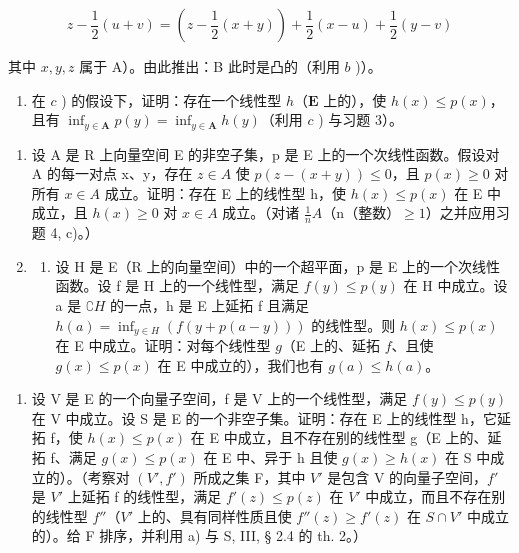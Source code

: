\[
z - \frac {1}{2} (u + v) = \left(z - \frac {1}{2} (x + y)\right) + \frac {1}{2} (x - u) + \frac {1}{2} (y - v)
\]

其中 \(x, y, z\) 属于 A）。由此推出：B 此时是凸的（利用 \(b\) )）。

\begin{enumerate}
\def\labelenumi{\alph{enumi})}
\setcounter{enumi}{3}
\tightlist
\item
  在 \(c\) ) 的假设下，证明：存在一个线性型 \(h\)（\(\mathbf{E}\) 上的），使 \(h(x) \leqslant p(x)\)，且有 \(\inf_{y \in \mathbf{A}} p(y) = \inf_{y \in \mathbf{A}} h(y)\)（利用 \(c\) ) 与习题 3）。
\end{enumerate}

\begin{enumerate}
\def\labelenumi{\arabic{enumi})}
\setcounter{enumi}{4}
\item
  设 A 是 R 上向量空间 E 的非空子集，p 是 E 上的一个次线性函数。假设对 A 的每一对点 x、y，存在 \(z \in A\) 使 \(p(z - (x + y)) \leqslant 0\)，且 \(p(x) \geqslant 0\) 对所有 \(x \in A\) 成立。证明：存在 E 上的线性型 h，使 \(h(x) \leqslant p(x)\) 在 E 中成立，且 \(h(x) \geqslant 0\) 对 \(x \in A\) 成立。（对诸 \(\frac{1}{n}A\)（n（整数）\(\geqslant 1\)）之并应用习题 4, c)。）
\item
  \begin{enumerate}
  \def\labelenumii{\alph{enumii})}
  \tightlist
  \item
    设 H 是 E（R 上的向量空间）中的一个超平面，p 是 E 上的一个次线性函数。设 f 是 H 上的一个线性型，满足 \(f(y) \leqslant p(y)\) 在 H 中成立。设 a 是 \(\complement H\) 的一点，h 是 E 上延拓 f 且满足 \(h(a) = \inf_{y \in H} (f(y + p(a - y)))\) 的线性型。则 \(h(x) \leqslant p(x)\) 在 E 中成立。证明：对每个线性型 \(g\)（E 上的、延拓 \(f\)、且使 \(g(x) \leqslant p(x)\) 在 E 中成立的），我们也有 \(g(a) \leqslant h(a)\)。
  \end{enumerate}
\end{enumerate}

\begin{enumerate}
\def\labelenumi{\alph{enumi})}
\setcounter{enumi}{1}
\tightlist
\item
  设 V 是 E 的一个向量子空间，f 是 V 上的一个线性型，满足 \(f(y) \leqslant p(y)\) 在 V 中成立。设 S 是 E 的一个非空子集。证明：存在 E 上的线性型 h，它延拓 f，使 \(h(x) \leqslant p(x)\) 在 E 中成立，且不存在别的线性型 g（E 上的、延拓 f、满足 \(g(x) \leqslant p(x)\) 在 E 中、异于 h 且使 \(g(x) \geqslant h(x)\) 在 S 中成立的）。（考察对 \((V', f')\) 所成之集 F，其中 \(V'\) 是包含 V 的向量子空间，\(f'\) 是 \(V'\) 上延拓 f 的线性型，满足 \(f'(z) \leqslant p(z)\) 在 \(V'\) 中成立，而且不存在别的线性型 \(f''\)（\(V'\) 上的、具有同样性质且使 \(f''(z) \geqslant f'(z)\) 在 \(S \cap V'\) 中成立的）。给 F 排序，并利用 a) 与 S, III, § 2.4 的 th. 2。）
\end{enumerate}

